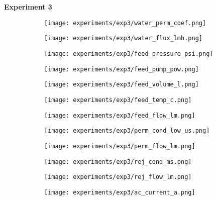 \documentclass{article}
\begin{document}
    \pagebreak
    
    \textbf{Experiment 3}
    \begin{figure}[H]
        \centering
        \begin{subfigure}{0.48\linewidth}
		    \texttt{[image: experiments/exp3/water\_perm\_coef.png]}
	    \end{subfigure}
	    \begin{subfigure}{0.48\linewidth}
		    \texttt{[image: experiments/exp3/water\_flux\_lmh.png]}
	    \end{subfigure}
	    \begin{subfigure}{0.48\linewidth}
		    \texttt{[image: experiments/exp3/feed\_pressure\_psi.png]}
	    \end{subfigure}
	    \begin{subfigure}{0.48\linewidth}
		    \texttt{[image: experiments/exp3/feed\_pump\_pow.png]}
	    \end{subfigure}
	    \begin{subfigure}{0.48\linewidth}
		    \texttt{[image: experiments/exp3/feed\_volume\_l.png]}
	    \end{subfigure}
	    \begin{subfigure}{0.48\linewidth}
		    \texttt{[image: experiments/exp3/feed\_temp\_c.png]}
	    \end{subfigure}
	    \begin{subfigure}{0.48\linewidth}
		    \texttt{[image: experiments/exp3/feed\_flow\_lm.png]}
	    \end{subfigure}
	    \begin{subfigure}{0.48\linewidth}
		    \texttt{[image: experiments/exp3/perm\_cond\_low\_us.png]}
	    \end{subfigure}
	    \begin{subfigure}{0.48\linewidth}
		    \texttt{[image: experiments/exp3/perm\_flow\_lm.png]}
	    \end{subfigure}
	    \begin{subfigure}{0.48\linewidth}
		    \texttt{[image: experiments/exp3/rej\_cond\_ms.png]}
	    \end{subfigure}
	    \begin{subfigure}{0.48\linewidth}
		    \texttt{[image: experiments/exp3/rej\_flow\_lm.png]}
	    \end{subfigure}
	    \begin{subfigure}{0.48\linewidth}
		    \texttt{[image: experiments/exp3/ac\_current\_a.png]}
	    \end{subfigure}
    \end{figure}
    
\end{document}
